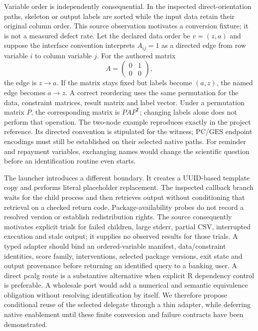 Variable order is independently consequential. In the inspected direct-orientation paths,
skeleton or output labels are sorted while the input data retain their original column order.
This source observation motivates a conversion fixture; it is not a measured defect rate.
Let the declared data order be $v=(z,a)$ and suppose the interface convention interprets
$A_{ij}=1$ as a directed edge from row variable $i$ to column variable $j$. For the authored matrix
\[
 A=\begin{pmatrix}0&1\\0&0\end{pmatrix},
\]
the edge is $z\to a$. If the matrix stays fixed but labels become $(a,z)$, the named edge becomes
$a\to z$. A correct reordering uses the same permutation for the data, constraint matrices,
result matrix and label vector. Under a permutation matrix $P$, the corresponding matrix is
$PAP^{\mathsf T}$; changing labels alone does not perform that operation. The two-node example
reproduces exactly in the project reference. Its directed convention is stipulated for the
witness; PC/GES endpoint encodings must still be established on their selected native paths.
For reminder and repayment variables, exchanging names would change the scientific question
before an identification routine even starts.\citep{exec28_bp_reference,exec28_bp_cdt}

The launcher introduces a different boundary. It creates a UUID-based template copy and
performs literal placeholder replacement. The inspected callback branch waits for the child
process and then retrieves output without conditioning that retrieval on a checked return code.
Package-availability probes do not record a resolved version or establish redistribution rights.
The source consequently motivates explicit trials for failed children, large stderr, partial
CSV, interrupted execution and stale output; it supplies no observed results for those trials.
A typed adapter should bind an ordered-variable manifest, data/constraint identities, score
family, interventions, selected package versions, exit state and output provenance before
returning an identified query to a banking user. A direct pcalg route is a substantive alternative
when explicit R dependency control is preferable. A wholesale port would add a numerical and
semantic equivalence obligation without resolving identification by itself. We therefore propose
conditional reuse of the selected delegate through a thin adapter, while deferring native
enablement until these finite conversion and failure contracts have been demonstrated.
\citep{exec28_bp_cdt}


